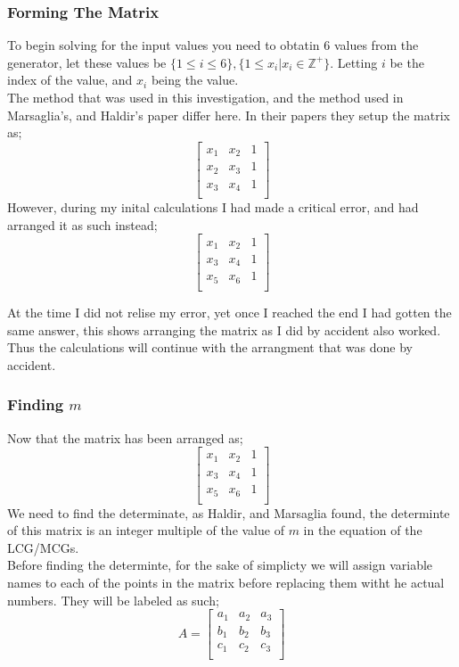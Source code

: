 \documentclass[12pft, english]{article}
\begin{document}
\begin{multicols}{2}
  \subsubsection{Forming The Matrix}
  To begin solving for the input values you need to obtatin 6 values from the generator, let these values be \( \{ 1 \leq i \leq 6 \} , \{1 \leq x_{i} | x_{i} \in \mathbb{Z}^{+}\} \). Letting \( i \) be the index of the value, and \( x_{i}\) being the value. \\
  The method that was used in this investigation, and the method used in Marsaglia's, and Haldir's paper differ here. In their papers they setup the matrix as; \citep{fallOntoPlanes} \citep{reteamHal}
    \[
    \begin{bmatrix}
      x_{1} & x_{2} & 1 \\
      x_{2} & x_{3} & 1 \\
      x_{3} & x_{4} & 1 \\
    \end{bmatrix}
  \]
    However, during my inital calculations I had made a critical error, and had arranged it as such instead;
  \[
    \begin{bmatrix}
      x_{1} & x_{2} & 1 \\
      x_{3} & x_{4} & 1 \\
      x_{5} & x_{6} & 1 \\
    \end{bmatrix}
  \]

  At the time I did not relise my error, yet once I reached the end I had gotten the same answer, this shows arranging the matrix as I did by accident also worked. Thus the calculations will continue with the arrangment that was done by accident.

  \subsubsection{Finding \(m\)}
  Now that the matrix has been arranged as;
 \[
    \begin{bmatrix}
      x_{1} & x_{2} & 1 \\
      x_{3} & x_{4} & 1 \\
      x_{5} & x_{6} & 1 \\
    \end{bmatrix}
  \]
  We need to find the determinate, as Haldir, and Marsaglia found, the determinte of this matrix is an integer multiple of the value of \(m\) in the equation of the LCG/MCGs. \\
  Before finding the determinte, for the sake of simplicty we will assign variable names to each of the points in the matrix before replacing them witht he actual numbers. They will be labeled as such;
  \[
    A =
    \begin{bmatrix}
      a_{1} & a_{2} & a_{3} \\
      b_{1} & b_{2} & b_{3} \\
      c_{1} & c_{2} & c_{3} \\
    \end{bmatrix}
  \]


\end{multicols}
\end{document}
